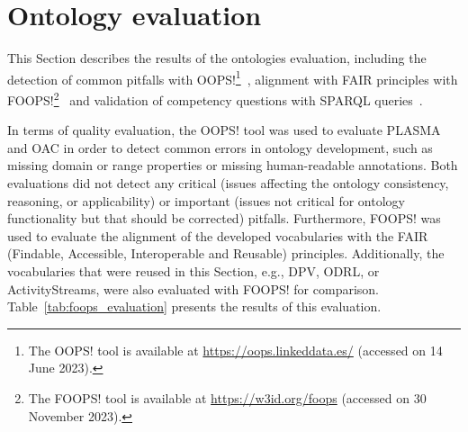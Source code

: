 \section{Ontology evaluation}
\label{sec:evaluation}

This Section describes the results of the ontologies evaluation, including the detection of common pitfalls with OOPS!\footnote{The OOPS! tool is available at \url{https://oops.linkeddata.es/} (accessed on 14 June 2023).}~\citep{poveda-villalon_oops_2014}, alignment with FAIR principles with FOOPS!\footnote{The FOOPS! tool is available at \url{https://w3id.org/foops} (accessed on 30 November 2023).}~\citep{garijo_foops_2021} and validation of competency questions with SPARQL queries~\citep{harris_sparql_2013}.

In terms of quality evaluation, the OOPS! tool was used to evaluate PLASMA and OAC in order to detect common errors in ontology development, such as missing domain or range properties or missing human-readable annotations.
Both evaluations did not detect any critical (issues affecting the ontology consistency, reasoning, or applicability) or important (issues not critical for ontology functionality but that should be corrected) pitfalls.
Furthermore, FOOPS! was used to evaluate the alignment of the developed vocabularies with the FAIR (Findable, Accessible, Interoperable and Reusable) principles.
Additionally, the vocabularies that were reused in this Section, e.g., DPV, ODRL, or ActivityStreams, were also evaluated with FOOPS! for comparison.
Table~\ref{tab:foops_evaluation} presents the results of this evaluation.

\begin{table}[htp]
    \centering
    \caption{Evaluation of the alignment of the developed and reused vocabularies with FAIR principles using FOOPS!.}
    \label{tab:foops_evaluation}
\end{table}

